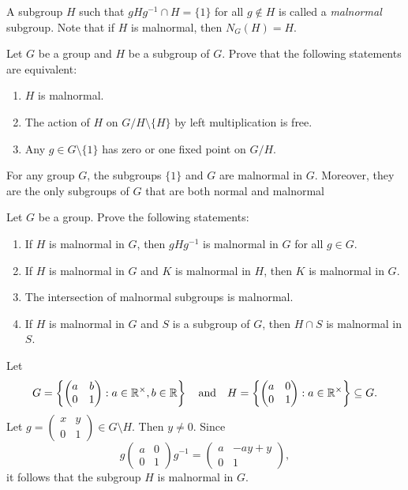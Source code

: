 A subgroup $H$ such that $gHg^{-1}\cap H=\{1\}$ for all 
$g\not\in H$ is called a \emph{malnormal} subgroup. 
Note that if $H$ is malnormal, then $N_G(H)=H$. 

\begin{exercise}
\label{xca:malnormal}
    Let $G$ be a group and $H$ be a subgroup of $G$. Prove that the following statements are equivalent: 
    \begin{enumerate}
        \item $H$ is malnormal. 
        \item The action of $H$ 
            on $G/H\setminus\{H\}$ by left multiplication is free. 
        \item Any $g\in G\setminus\{1\}$ has zero
            or one fixed point on $G/H$. 
    \end{enumerate}
\end{exercise}

For any group $G$, the subgroups $\{1\}$ and $G$ are malnormal in $G$. Moreover, they are the only subgroups of $G$ that are both normal and malnormal

\begin{exercise}
    Let $G$ be a group. Prove the following statements:
    \begin{enumerate}

        \item If $H$ is malnormal in $G$, then
        $gHg^{-1}$ is malnormal in $G$ for all $g\in G$. 
        \item If $H$ is malnormal in $G$ and 
        $K$ is malnormal in $H$, then $K$ is malnormal
        in $G$. 
        \item The intersection of malnormal
        subgroups is malnormal.
        \item If $H$ is malnormal in $G$ and 
        $S$ is a subgroup of $G$, then 
        $H\cap S$ is malnormal in $S$. 
        
    \end{enumerate}
\end{exercise}

\begin{example}
    Let 
    \[
    G=\left\{\begin{pmatrix}a&b\\0&1\end{pmatrix}:a\in\mathbb{R}^{\times},b\in\mathbb{R}\right\}\quad\text{and}\quad 
    H=\left\{\begin{pmatrix}a&0\\0&1\end{pmatrix}:a\in\mathbb{R}^{\times}\right\}\subseteq G. 
    \]
    Let $g=\begin{pmatrix}x&y\\0&1\end{pmatrix}\in G\setminus H$. Then $y\ne 0$. Since  
    \[
    g\begin{pmatrix}a&0\\0&1\end{pmatrix}g^{-1}
    =\begin{pmatrix}a&-ay+y\\0&1\end{pmatrix},
    \]
    it follows that the subgroup $H$ 
    is malnormal in $G$. 
\end{example}

